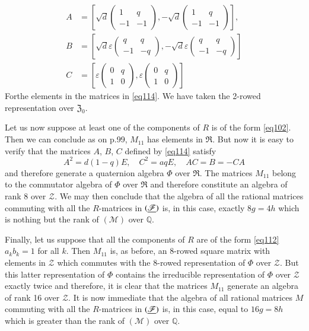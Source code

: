 \begin{align*}
A &= \left[\sqrt{d}
\begin{pmatrix}
1 & q\\
-1 & -1
\end{pmatrix},
-\sqrt{d}
\begin{pmatrix}
1 & q\\
-1 & -1
\end{pmatrix}\right],\\
B&=\left[
\sqrt{d}\varepsilon
\begin{pmatrix}
q & q\\
-1 & -q
\end{pmatrix},
-\sqrt{d}\varepsilon
\begin{pmatrix}
q & q\\
-1 & -q
\end{pmatrix}
\right]\\
C &= \left[\varepsilon
\begin{pmatrix}
0 & q\\
1 & 0
\end{pmatrix},
\varepsilon
\begin{pmatrix}
0 & q\\
1 & 0
\end{pmatrix}
\right]\tag{114}\label{eq114}
\end{align*}
For\pageoriginale the elements in the matrices in \eqref{eq114}. We have
taken the 2-rowed representation over $\mathfrak{Z}_{0}$.

Let us now suppose at least one of the components of $R$ is of the
form \eqref{eq102}. Then we can conclude as on p.99, $M_{11}$ has
elements in $\mathfrak{R}$. But now it is easy to verify that the
matrices $A$, $B$, $C$ defined by \eqref{eq114} satisfy
$$
A^{2}=d(1-q)E,\quad C^{2}=aq E,\quad AC=B=-CA
$$
and therefore generate a quaternion algebra $\Phi$ over
$\mathfrak{R}$. The matrices $M_{11}$ belong to the commutator algebra
of $\Phi$ over $\mathfrak{R}$ and therefore constitute an algebra of
rank $8$ over $\mathscr{Z}$. We may then conclude that the algebra of
all the rational matrices commuting with all the $R$-matrices in
$(\underline{\mathscr{F}})$ is, in this case, exactly $8g=4h$ which is nothing
but the rank of $(\mathscr{M})$ over $\mathbb{Q}$.

Finally, let us suppose that all the components of $R$ are of the form
\eqref{eq112} \ie $a_{k}b_{k}=1$ for all $k$. Then $M_{11}$ is, as
before, an $8$-rowed square matrix with elements in $\mathscr{Z}$
which commutes with the 8-rowed representation of $\Phi$ over
$\mathscr{Z}$. But this latter representation of $\Phi$ contains the
irreducible representation of $\Phi$ over $\mathscr{Z}$ exactly twice
and therefore, it is clear that the matrices $M_{11}$ generate an
algebra of rank 16 over $\mathscr{Z}$. It is now immediate that the
algebra of all rational matrices $M$ commuting with all the
$R$-matrices in $(\underline{\mathscr{F}})$ is, in this case, equal to
$16g=8h$ which is greater than the rank of $(\mathscr{M})$ over
$\mathbb{Q}$.

